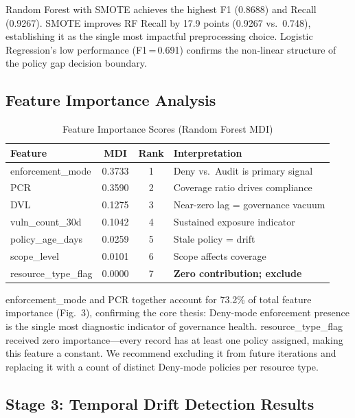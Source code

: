 \documentclass[conference]{IEEEtran}
\begin{document}
Random Forest with SMOTE achieves the highest F1 (0.8688) and Recall 
(0.9267). SMOTE improves RF Recall by 17.9 points (0.9267 vs.\ 0.748), 
establishing it as the single most impactful preprocessing choice. 
Logistic Regression's low performance (F1\,=\,0.691) confirms the 
non-linear structure of the policy gap decision boundary.

\subsection{Feature Importance Analysis}

\begin{table}[htbp]
\caption{Feature Importance Scores (Random Forest MDI)}
\label{tab:importance}
\centering
\small
\begin{tabular}{lccl}
\toprule
\textbf{Feature} & \textbf{MDI} & \textbf{Rank} & \textbf{Interpretation} \\
\midrule
enforcement\_mode & 0.3733 & 1 & Deny vs.\ Audit is primary signal \\
PCR & 0.3590 & 2 & Coverage ratio drives compliance \\
DVL & 0.1275 & 3 & Near-zero lag = governance vacuum \\
vuln\_count\_30d & 0.1042 & 4 & Sustained exposure indicator \\
policy\_age\_days & 0.0259 & 5 & Stale policy = drift \\
scope\_level & 0.0101 & 6 & Scope affects coverage \\
resource\_type\_flag & 0.0000 & 7 & \textbf{Zero contribution; exclude} \\
\bottomrule
\end{tabular}
\end{table}

enforcement\_mode and PCR together account for 73.2\% of total feature 
importance (Fig.~3), confirming the core thesis: Deny-mode enforcement 
presence is the single most diagnostic indicator of governance health. 
resource\_type\_flag received zero importance---every record has at 
least one policy assigned, making this feature a constant. We recommend 
excluding it from future iterations and replacing it with a count of 
distinct Deny-mode policies per resource type.

\subsection{Stage 3: Temporal Drift Detection Results}
\end{document}
